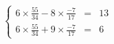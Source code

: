 \documentclass[preview]{standalone}
\begin{document}
\begin{align*}
\left\{ \begin{array}{rcl} 6\times\frac{55}{34} - 8\times\frac{-7}{17} & = & 13 \\ 6\times\frac{55}{34} + 9\times\frac{-7}{17} & = &6 \end{array} \right.
\end{align*}
\end{document}
